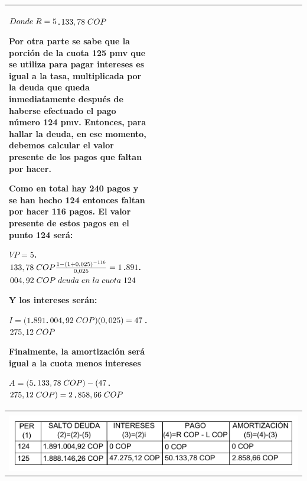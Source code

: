 \begin{center}
\begin{longtable}[H]{|p{0.5\linewidth}|p{0.5\linewidth}|}
{				  $Donde \hspace{1mm} R =  5$.$133,78 \hspace{1mm} COP$
			
				Por otra parte se sabe que la porción de la cuota 125 pmv que se utiliza para pagar intereses es igual a la tasa, multiplicada por la deuda que queda inmediatamente después de haberse efectuado el pago número 124 pmv. Entonces, para hallar la deuda, en ese momento, debemos calcular el valor presente de los pagos que faltan por hacer.
				
				Como en total hay 240 pagos y se han hecho 124 entonces faltan por hacer 116 pagos. El valor presente de estos pagos en el punto 124 será:
				
				$ VP =   5$.$133,78 \hspace{1mm} COP  \frac{1-(1+ 0,025)^{-116}}{0,025} =   1$.$891$.$004,92 \hspace{1mm}  COP\hspace{1mm} deuda \hspace{1mm}en\hspace{1mm} la \hspace{1mm}cuota \hspace{1mm}124 $ 
				
				Y los intereses serán:
				
				$ I= (  1$.$891$.$004,92 \hspace{1mm} COP)(0,025) =  47$.$275,12 \hspace{1mm} COP$
				
				Finalmente, la amortización será igual a la cuota menos intereses
				
				$ A= (  5$.$133,78 \hspace{1mm} COP)-( 47$.$275,12 \hspace{1mm} COP) =   2$.$858,66 \hspace{1mm} COP$
				
			}\\ \hline
			
			\rowcolor[HTML]{FFB183}
			\multicolumn{2}{|c|}{\cellcolor[HTML]{FFB183}\textbf{6. Respuesta}}   \\ \hline
			\multicolumn{2}{|c|}{ \includegraphics[trim=-78 -5 -78 -5]{7_Capitulo/img/ejemplos/5/5_2.pdf} }   \\ \hline
			

\end{longtable}
\end{center}
